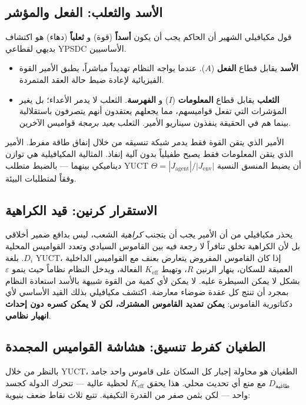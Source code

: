 \documentclass[12pt,a4paper]{article}
\newcommand{\Keff}{K_{\mathrm{eff}}}
\begin{document}
	\subsection{الأسد والثعلب: الفعل والمؤشر}
	
	قول مكيافيلي الشهير أن الحاكم يجب أن يكون \textbf{أسداً} (قوة) و \textbf{ثعلباً} (دهاء) هو اكتشاف بديهي لقطاعي YPSDC الأساسيين.
	
	\begin{itemize}[leftmargin=*]
		\item \textbf{الأسد} يقابل قطاع \textbf{الفعل} (\(A\)). عندما يواجه النظام تهديداً مباشراً، يطبق الأمير القوة الفيزيائية لإعادة ضبط حالة العقد المتمردة.
		\item \textbf{الثعلب} يقابل قطاع \textbf{المعلومات} (\(I\)) و \textbf{الفهرسة}. الثعلب لا يدمر الأعداء؛ بل يغير المؤشرات التي تفعل قواميسهم، مما يجعلهم يعتقدون أنهم يتصرفون باستقلالية بينما هم في الحقيقة ينفذون سيناريو الأمير. الثعلب \emph{يعيد برمجة} قواميس الآخرين.
	\end{itemize}
	
	الأمير الذي يتقن القوة فقط يدمر شبكة تنسيقه من خلال إنفاق طاقة مفرط. الأمير الذي يتقن المعلومات فقط يصبح طفيلياً بدون آلية إنفاذ. المثالية المكيافيلية هي توازن ديناميكي بينهما — بالضبط متطلب YUCT أن يضبط المنسق النسبة \(\Theta = |J_{\mathrm{agent}}|/|J_{\mathrm{env}}|\) وفقاً لمتطلبات البيئة.
	
	\subsection{الاستقرار كرنين: قيد الكراهية}
	
	يحذر مكيافيلي من أن الأمير يجب أن يتجنب \emph{كراهية} الشعب، ليس بدافع ضمير أخلاقي بل لأن الكراهية تخلق تنافراً لا رجعة فيه بين القاموس السيادي وتعدد القواميس المحلية \(D_i\). بلغة YUCT، إذا كان القاموس المفروض يتعارض بعنف مع القواميس الداخلية العميقة للسكان، ينهار الرنين \(R\)، وتهبط \(\Keff\) الفعالة، ويدخل النظام نظاماً حيث ينمو \(\varepsilon\) بشكل لا يمكن السيطرة عليه. لا يمكن لأي كمية من القوة شبيهة بالأسد استعادة النظام بمجرد أن تنتج كل عقدة ضوضاء معارضة. اكتشف مكيافيلي بذلك القيد الأساسي لأي دكتاتورية القاموس: \textbf{يمكن تمديد القاموس المشترك، لكن لا يمكن كسره دون إحداث انهيار نظامي}.
	
	\subsection{الطغيان كفرط تنسيق: هشاشة القواميس المجمدة}
	
	بالنظر من خلال YUCT، الطغيان هو محاولة إجبار كل السكان على قاموس واحد جامد \(D_{\text{طاغية}}\) مع منع أي تحديث محلي. هذا يحقق \(\Keff\) لحظية عالية — تتحرك الدولة كجسد واحد — لكن بثمن صفر من القدرة التكيفية. تتبع ثلاث نقاط ضعف بنيوية:
	
\end{document}
